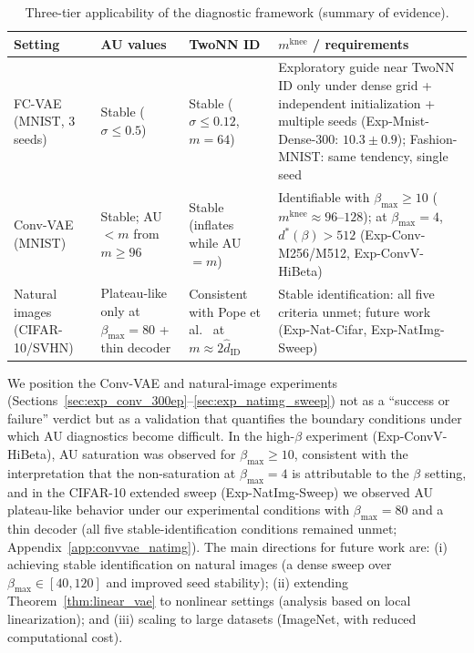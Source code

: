 \documentclass[make,article,submit,pdftex,moreauthors]{Definitions/mdpi}
\newcommand{\mknee}{m^{\mathrm{knee}}}
\begin{document}
\begin{table}[H]
\centering
\caption{Three-tier applicability of the diagnostic framework (summary of evidence).}
\label{tab:applicability}
\small
\begin{tabularx}{\textwidth}{p{2.6cm}XXX}
\toprule
\textbf{Setting} & \textbf{AU values} & \textbf{TwoNN ID} & \textbf{$\mknee$ / requirements} \\
\midrule
FC-VAE (MNIST, 3 seeds) & Stable ($\sigma \leq 0.5$) & Stable ($\sigma \leq 0.12$, $m=64$) &
Exploratory guide near TwoNN ID only under dense grid + independent initialization + multiple seeds
(Exp-Mnist-Dense-300: $10.3 \pm 0.9$); Fashion-MNIST: same tendency, single seed \\
\addlinespace
Conv-VAE (MNIST) & Stable; AU$<m$ from $m \geq 96$ & Stable (inflates while AU$=m$) &
Identifiable with $\beta_{\max} \geq 10$ ($\mknee \approx 96$--$128$); at $\beta_{\max}=4$, $d^*(\beta) > 512$
(Exp-Conv-M256/M512, Exp-ConvV-HiBeta) \\
\addlinespace
Natural images (CIFAR-10/SVHN) & Plateau-like only at $\beta_{\max}=80$ + thin decoder &
Consistent with Pope et al.~\cite{pope2021intrinsic} at $m \approx 2\hat{d}_\mathrm{ID}$ &
Stable identification: all five criteria unmet; future work
(Exp-Nat-Cifar, Exp-NatImg-Sweep) \\
\bottomrule
\end{tabularx}
\end{table}

We position the Conv-VAE and natural-image experiments
(Sections~\ref{sec:exp_conv_300ep}--\ref{sec:exp_natimg_sweep}) not as a
``success or failure'' verdict but as a validation that quantifies the
boundary conditions under which AU diagnostics become difficult.
In the high-$\beta$ experiment (Exp-ConvV-HiBeta), AU saturation was observed
for $\beta_{\max} \geq 10$, consistent with the interpretation that the
non-saturation at $\beta_{\max}=4$ is attributable to the $\beta$ setting,
and in the CIFAR-10 extended sweep (Exp-NatImg-Sweep) we observed AU
plateau-like behavior under our experimental conditions with
$\beta_{\max}=80$ and a thin decoder (all five stable-identification
conditions remained unmet; Appendix~\ref{app:convvae_natimg}).
The main directions for future work are:
(i) achieving stable identification on natural images (a dense sweep over
$\beta_{\max} \in [40,120]$ and improved seed stability);
(ii) extending Theorem~\ref{thm:linear_vae} to nonlinear settings (analysis
based on local linearization); and
(iii) scaling to large datasets (ImageNet, with reduced computational cost).
\end{document}

